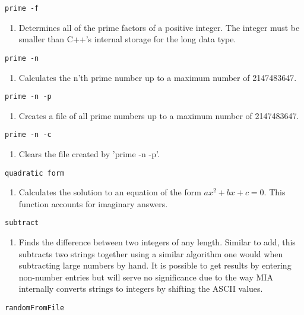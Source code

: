 \begin{lstlisting} 
prime -f   
\end{lstlisting}
\begin{enumerate}
	\item[] Determines all of the prime factors of a positive integer. The integer must be smaller than C++'s internal storage for the long data type.
\end{enumerate}
\begin{lstlisting} 
prime -n  
\end{lstlisting}
\begin{enumerate}
	\item[] Calculates the n'th prime number up to a maximum number of 2147483647.
\end{enumerate}
\begin{lstlisting} 
prime -n -p   
\end{lstlisting}
\begin{enumerate}
	\item[] Creates a file of all prime numbers up to a maximum number of 2147483647.
\end{enumerate}
\begin{lstlisting} 
prime -n -c   
\end{lstlisting}
\begin{enumerate}
	\item[] Clears the file created by 'prime -n -p'.
\end{enumerate}
\begin{lstlisting} 
quadratic form
\end{lstlisting}
\begin{enumerate}
	\item[] Calculates the solution to an equation of the form $ax^2+bx+c=0$. This function accounts for imaginary answers.
\end{enumerate}
\begin{lstlisting} 
subtract   
\end{lstlisting}
\begin{enumerate}
	\item[] Finds the difference between two integers of any length. Similar to add, this subtracts two strings together using a similar algorithm one would when subtracting large numbers by hand. It is possible to get results by entering non-number entries but will serve no significance due to the way MIA internally converts strings to integers by shifting the ASCII values.
\end{enumerate}
\begin{lstlisting} 
randomFromFile
\end{lstlisting}
